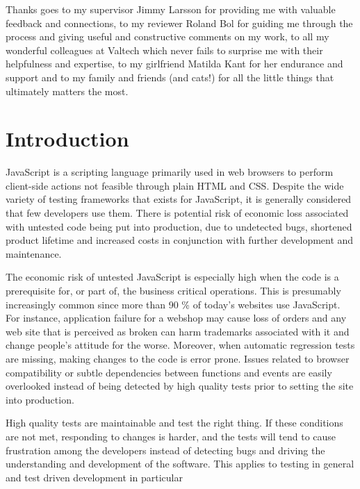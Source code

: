 \documentclass[11pt]{article}
\begin{document}
Thanks goes to my supervisor Jimmy Larsson for providing me with valuable feedback and connections, to my reviewer Roland Bol for guiding me through the process and giving useful and constructive comments on my work, to all my wonderful colleagues at Valtech which never fails to surprise me with their helpfulness and expertise, to my girlfriend Matilda Kant for her endurance and support and to my family and friends (and cats!) for all the little things that ultimately matters the most.

\newpage
\clearpage\mbox{}\clearpage
\newpage

\tableofcontents

\newpage
\clearpage\mbox{}\clearpage
\newpage


\section{Introduction}

JavaScript is a scripting language primarily used in web browsers to perform client-side actions not feasible through plain HTML and CSS. Despite the wide variety of testing frameworks that exists for JavaScript, it is generally considered that few developers use them. There is potential risk of economic loss associated with untested code being put into production, due to undetected bugs, shortened product lifetime and increased costs in conjunction with further development and maintenance.

The economic risk of untested JavaScript is especially high when the code is a prerequisite for, or part of, the business critical operations. This is presumably increasingly common since more than 90 \% of today's websites use JavaScript\cite{BusinessJavascript}. For instance, application failure for a webshop may cause loss of orders and any web site that is perceived as broken can harm trademarks associated with it and change people's attitude for the worse. Moreover, when automatic regression tests are missing, making changes to the code is error prone. Issues related to browser compatibility or subtle dependencies between functions and events are easily overlooked instead of being detected by high quality tests prior to setting the site into production.

High quality tests are maintainable and test the right thing. If these conditions are not met, responding to changes is harder, and the tests will tend to cause frustration among the developers instead of detecting bugs and driving the understanding and development of the software\cite{Clean}. This applies to testing in general and test driven development in particular
\end{document}
